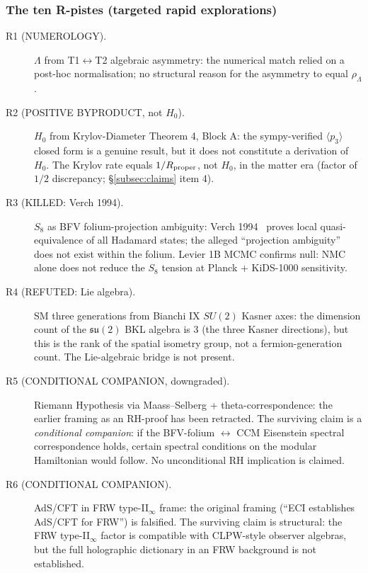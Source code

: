 \subsubsection*{The ten R-pistes (targeted rapid explorations)}

\begin{description}

\item[R1 (NUMEROLOGY).]
  $\Lambda$ from T1$\leftrightarrow$T2 algebraic asymmetry: the numerical
  match relied on a post-hoc normalisation; no structural reason for the
  asymmetry to equal $\rho_\Lambda$.

\item[R2 (POSITIVE BYPRODUCT, not $H_0$).]
  $H_0$ from Krylov-Diameter Theorem 4, Block A: the sympy-verified
  $\langle p_3 \rangle$ closed form is a genuine result, but it does not
  constitute a derivation of $H_0$.  The Krylov rate equals $1/R_{\rm proper}$,
  not $H_0$, in the matter era (factor of $1/2$ discrepancy;
  \S\ref{subsec:claims} item 4).

\item[R3 (KILLED: Verch 1994).]
  $S_8$ as BFV folium-projection ambiguity: Verch 1994~\cite{Verch1994}
  proves local quasi-equivalence of all Hadamard states; the alleged
  ``projection ambiguity'' does not exist within the folium.
  Levier 1B MCMC confirms null: NMC alone does not reduce the
  $S_8$ tension at Planck + KiDS-1000 sensitivity.

\item[R4 (REFUTED: Lie algebra).]
  SM three generations from Bianchi IX $SU(2)$ Kasner axes: the
  dimension count of the $\mathfrak{su}(2)$ BKL algebra is 3 (the three
  Kasner directions), but this is the rank of the spatial isometry group,
  not a fermion-generation count.  The Lie-algebraic bridge is not present.

\item[R5 (CONDITIONAL COMPANION, downgraded).]
  Riemann Hypothesis via Maass--Selberg + theta-correspondence:
  the earlier framing as an RH-proof has been retracted.
  The surviving claim is a \emph{conditional companion}: if the
  BFV-folium $\leftrightarrow$ CCM Eisenstein spectral correspondence holds,
  certain spectral conditions on the modular Hamiltonian would follow.
  No unconditional RH implication is claimed.

\item[R6 (CONDITIONAL COMPANION).]
  AdS/CFT in FRW type-II$_\infty$ frame: the original framing
  (``ECI establishes AdS/CFT for FRW'') is falsified.  The surviving
  claim is structural: the FRW type-II$_\infty$ factor is compatible
  with CLPW-style observer algebras, but the full holographic dictionary
  in an FRW background is not established.


\end{description}
